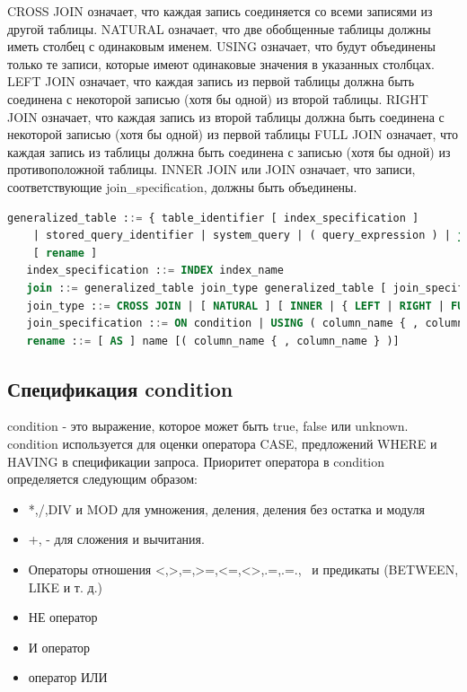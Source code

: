 CROSS JOIN означает, что каждая запись соединяется со всеми записями из другой таблицы.
NATURAL означает, что две обобщенные таблицы должны иметь столбец с одинаковым именем. 
USING означает, что будут объединены только те записи, 
которые имеют одинаковые значения в указанных столбцах.
LEFT JOIN означает, что каждая запись из первой таблицы
должна быть соединена с некоторой записью (хотя бы одной) из второй таблицы. 
RIGHT JOIN означает, что каждая запись из второй таблицы
должна быть соединена с некоторой записью (хотя бы одной) из первой таблицы
FULL JOIN означает, что каждая запись из таблицы должна быть соединена
с записью (хотя бы одной) из противоположной таблицы.
INNER JOIN или JOIN означает, что записи, соответствующие join\_specification, должны быть объединены.

\begin{lstlisting}[language=sql, label=some-code, caption=Спецификация generalized\_table]
   generalized_table ::= { table_identifier [ index_specification ] 
    | stored_query_identifier | system_query | ( query_expression ) | join }
    [ rename ]
   index_specification ::= INDEX index_name
   join ::= generalized_table join_type generalized_table [ join_specification ]
   join_type ::= CROSS JOIN | [ NATURAL ] [ INNER | { LEFT | RIGHT | FULL } [ OUTER ] ] JOIN 
   join_specification ::= ON condition | USING ( column_name { , column_name } )
   rename ::= [ AS ] name [( column_name { , column_name } )]
\end{lstlisting}

\subsection{Спецификация condition}

condition - это выражение, которое может быть true, false или unknown.
condition используется для оценки оператора CASE, предложений WHERE и HAVING в спецификации запроса.
Приоритет оператора в condition определяется следующим образом:

\begin{itemize}
   \item *,/,DIV и MOD для умножения, деления, деления без остатка и модуля
   \item +, - для сложения и вычитания.
   \item Операторы отношения <,>,=,>=,<=,<>,.=,.=.,~ и предикаты (BETWEEN, LIKE и т. д.)
   \item НЕ оператор
   \item И оператор
   \item оператор ИЛИ
\end{itemize}

